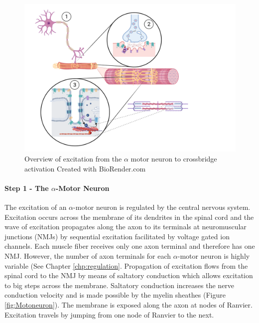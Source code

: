 \begin{figure}[!ht]
    \centering
    \includegraphics[width=1\linewidth]{./figure/excitation_overview.png}
    \caption{Overview of excitation from the $\alpha$ motor neuron to crossbridge activation \footnotesize{Created with BioRender.com}}
    \label{fig:excitation_overview}
\end{figure}

\paragraph{Step 1 - The $\alpha$-Motor Neuron}
The excitation of an $\alpha$-motor neuron is regulated by the central nervous system. Excitation occurs across the membrane of its dendrites in the spinal cord and the wave of excitation propagates along the axon to its terminals at neuromuscular junctions (NMJs) by sequential excitation facilitated by voltage gated ion channels. Each muscle fiber receives only one axon terminal and therefore has one NMJ. However, the number of axon terminals for each $\alpha$-motor neuron is highly variable (See Chapter \ref{chp:regulation}. Propagation of excitation flows from the spinal cord to the NMJ by means of saltatory conduction which allows excitation to big steps across the membrane. Saltatory conduction increases the nerve conduction velocity and is made possible by the myelin sheathes (Figure \ref{fig:Motoneuron}). The membrane is exposed along the axon at nodes of Ranvier. Excitation travels by jumping from one node of Ranvier to the next.\footnotemark{} 

